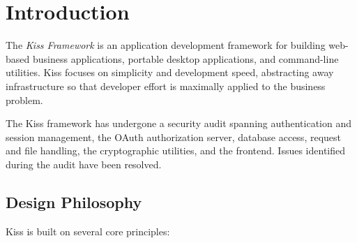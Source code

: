 \chapter{Introduction}
\label{ch:introduction}

The \emph{Kiss Framework} is an application development framework for building web-based business applications, portable desktop applications, and command-line utilities.  Kiss focuses on simplicity and development speed, abstracting away infrastructure so that developer effort is maximally applied to the business problem.

\begin{notebox}
The Kiss framework has undergone a security audit spanning authentication and session management, the OAuth authorization server, database access, request and file handling, the cryptographic utilities, and the frontend.  Issues identified during the audit have been resolved.
\end{notebox}

\section{Design Philosophy}
\label{sec:intro-philosophy}

Kiss is built on several core principles:

